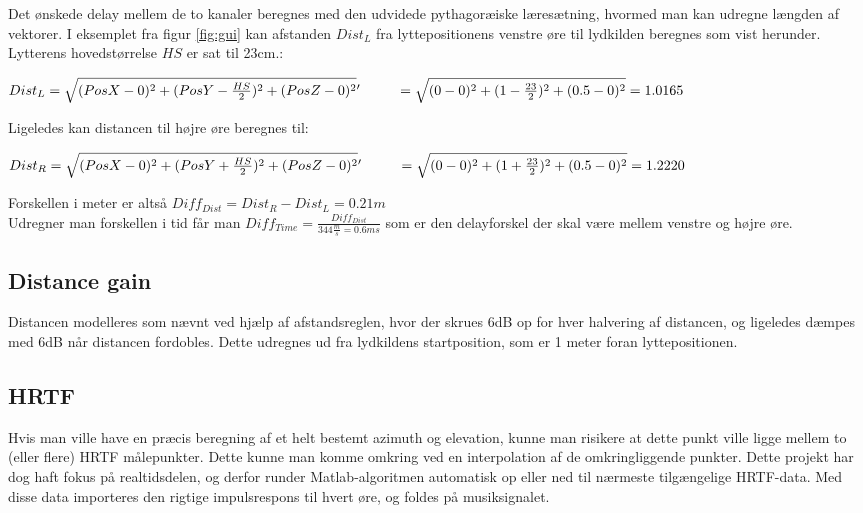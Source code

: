 Det ønskede delay mellem de to kanaler beregnes med den udvidede pythagoræiske læresætning, hvormed man kan udregne længden af vektorer. I eksemplet fra figur \ref{fig:gui} kan afstanden $Dist_L$ fra lyttepositionens venstre øre til lydkilden beregnes som vist herunder. Lytterens hovedstørrelse $HS$ er sat til 23cm.:

\( Dist_L = \sqrt{(PosX-0)^2+(PosY-\frac{HS}{2})^2+(PosZ-0)^2}\\
 '\hspace{.9cm} = \sqrt{(0-0)^2+(1-\frac{23}{2})^2+(0.5-0)^2} = 1.0165 \)
 
 Ligeledes kan distancen til højre øre beregnes til:
 
 \( Dist_R = \sqrt{(PosX-0)^2+(PosY+\frac{HS}{2})^2+(PosZ-0)^2}\\
'\hspace{.9cm} = \sqrt{(0-0)^2+(1+\frac{23}{2})^2+(0.5-0)^2} = 1.2220 \)

Forskellen i meter er altså \( Diff_{Dist} = Dist_R - Dist_L = 0.21m \) \\
Udregner man forskellen i tid får man \( Diff_{Time} = \frac{Diff_{Dist}}{344\frac{m}{s} = 0.6ms}   \) som er den delayforskel der skal være mellem venstre og højre øre.

\subsection{Distance gain}

Distancen modelleres som nævnt ved hjælp af afstandsreglen, hvor der skrues 6dB op for hver halvering af distancen, og ligeledes dæmpes med 6dB når distancen fordobles. Dette udregnes ud fra lydkildens startposition, som er 1 meter foran lyttepositionen.

\subsection{HRTF}

Hvis man ville have en præcis beregning af et helt bestemt azimuth og elevation, kunne man risikere at dette punkt ville ligge mellem to (eller flere) HRTF målepunkter. Dette kunne man komme omkring ved en interpolation af de omkringliggende punkter. Dette projekt har dog haft fokus på realtidsdelen, og derfor runder Matlab-algoritmen automatisk op eller ned til nærmeste tilgængelige HRTF-data. Med disse data importeres den rigtige impulsrespons til hvert øre, og foldes på musiksignalet.